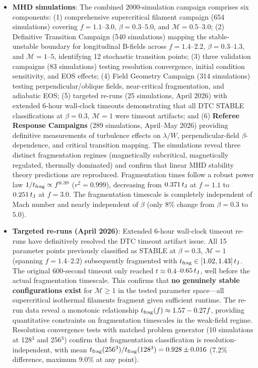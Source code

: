 \documentclass[twoside,twocolumn]{mnras}
\begin{document}
\begin{itemize}
    \item \textbf{MHD simulations}: The combined 2000-simulation campaign comprises six components: (1) comprehensive supercritical filament campaign (654 simulations) covering $f = 1.1$--$3.0$, $\beta = 0.3$--$5.0$, and $\mathcal{M} = 0.5$--$3.0$; (2) Definitive Transition Campaign (540 simulations) mapping the stable-unstable boundary for longitudinal B-fields across $f = 1.4$--$2.2$, $\beta = 0.3$--$1.3$, and $\mathcal{M} = 1$--$5$, identifying 12 stochastic transition points; (3) three validation campaigns (83 simulations) testing resolution convergence, initial condition sensitivity, and EOS effects; (4) Field Geometry Campaign (314 simulations) testing perpendicular/oblique fields, near-critical fragmentation, and adiabatic EOS; (5) targeted re-runs (25 simulations, April 2026) with extended 6-hour wall-clock timeouts demonstrating that all DTC STABLE classifications at $\beta = 0.3$, $\mathcal{M} = 1$ were timeout artifacts; and (6) \textbf{Referee Response Campaigns} (289 simulations, April--May 2026) providing definitive measurements of turbulence effects on $\lambda/W$, perpendicular-field $\beta$-dependence, and critical transition mapping. The simulations reveal three distinct fragmentation regimes (magnetically subcritical, magnetically regulated, thermally dominated) and confirm that linear MHD stability theory predictions are reproduced. Fragmentation times follow a robust power law $1/t_{\rm frag} \propto f^{0.39}$ ($r^2 = 0.999$), decreasing from $0.371\,t_{\rm J}$ at $f=1.1$ to $0.251\,t_{\rm J}$ at $f=3.0$. The fragmentation timescale is completely independent of Mach number and nearly independent of $\beta$ (only 8\% change from $\beta=0.3$ to $5.0$).

    \item \textbf{Targeted re-runs (April 2026)}: Extended 6-hour wall-clock timeout re-runs have definitively resolved the DTC timeout artifact issue. All 15 parameter points previously classified as STABLE at $\beta = 0.3$, $\mathcal{M} = 1$ (spanning $f = 1.4$--$2.2$) subsequently fragmented with $t_{\rm frag} \in [1.02, 1.43]\,t_{\rm J}$. The original 600-second timeout only reached $t \approx 0.4$--$0.65\,t_{\rm J}$, well before the actual fragmentation timescale. This confirms that \textbf{no genuinely stable configurations exist} for $\mathcal{M} \geq 1$ in the tested parameter space—all supercritical isothermal filaments fragment given sufficient runtime. The re-run data reveal a monotonic relationship $t_{\rm frag}(f) \approx 1.57 - 0.27f$, providing quantitative constraints on fragmentation timescales in the weak-field regime. Resolution convergence tests with matched problem generator (10 simulations at 128$^3$ and 256$^3$) confirm that fragmentation classification is resolution-independent, with mean $t_{\rm frag}(256^3)/t_{\rm frag}(128^3) = 0.928 \pm 0.016$ (7.2\% difference, maximum 9.0\% at any point).


\end{itemize}
\end{document}
